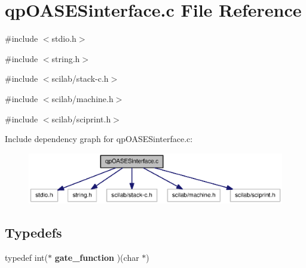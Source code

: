 \section{qpOASESinterface.c File Reference}
\label{qpOASESinterface_8c}
{\ttfamily \#include $<$stdio.h$>$}\par
{\ttfamily \#include $<$string.h$>$}\par
{\ttfamily \#include $<$scilab/stack-\/c.h$>$}\par
{\ttfamily \#include $<$scilab/machine.h$>$}\par
{\ttfamily \#include $<$scilab/sciprint.h$>$}\par
Include dependency graph for qpOASESinterface.c:
\nopagebreak
\begin{figure}[H]
\begin{center}
\leavevmode
\includegraphics[width=400pt]{qpOASESinterface_8c__incl}
\end{center}
\end{figure}
\subsection*{Typedefs}
\begin{DoxyCompactItemize}
\item 
typedef int($\ast$ {\bf gate\_\-function} )(char $\ast$)
\end{DoxyCompactItemize}
